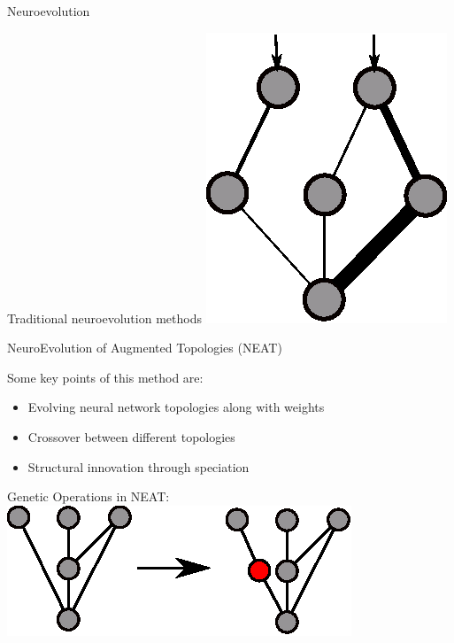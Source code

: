 \documentclass[6pt]{beamer}
\begin{document}
\begin{frame}{Neuroevolution}
\begin{block}{Traditional neuroevolution methods}
\centering
\includegraphics[height=0.7\textheight]{../Figures/Misc/networksMutationWeights2.eps}
\end{block}
\end{frame}

%

\begin{frame}{NeuroEvolution of Augmented Topologies (NEAT)~}
\begin{block}{Some key points of this method are:}
\begin{itemize}
\item Evolving neural network topologies along with weights
\item Crossover between different topologies
\item Structural innovation through speciation
\end{itemize}
\end{block}
\pause
\begin{block}{Genetic Operations in NEAT:}
\centering
\includegraphics[height=0.25\textheight]{../Figures/Misc/neatAddNode.eps}
\end{block}
\end{frame}
\end{document}
